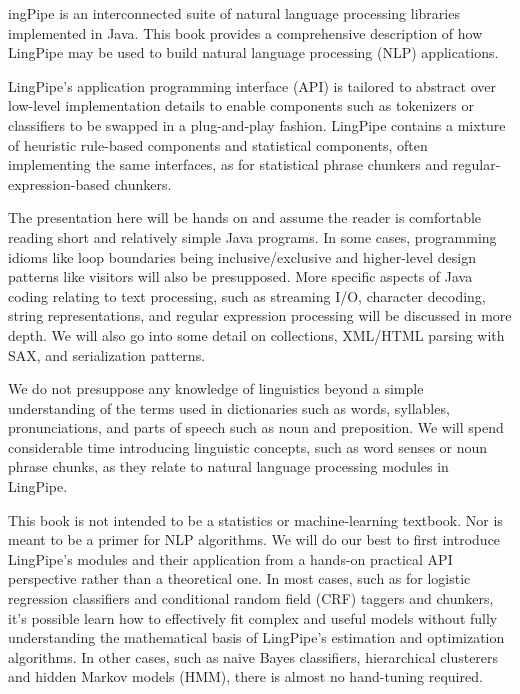 
ingPipe is an interconnected suite of natural language
processing libraries implemented in Java.  This book provides a
comprehensive description of how LingPipe may be used to build natural
language processing (NLP) applications.

LingPipe's application programming interface (API) is tailored to
abstract over low-level implementation details to enable components
such as tokenizers or classifiers to be swapped in a plug-and-play
fashion.  LingPipe contains a mixture of heuristic rule-based components and
statistical components, often implementing the same interfaces, as for
statistical phrase chunkers and regular-expression-based chunkers.

The presentation here will be hands on and assume the reader is
comfortable reading short and relatively simple Java programs.  In
some cases, programming idioms like loop boundaries being
inclusive/exclusive and higher-level design patterns like visitors
will also be presupposed.  More specific aspects of Java coding
relating to text processing, such as streaming I/O, character
decoding, string representations, and regular expression processing
will be discussed in more depth.  We will also go into some detail on
collections, XML/HTML parsing with SAX, and serialization patterns.

We do not presuppose any knowledge of linguistics beyond a simple
understanding of the terms used in dictionaries such as words,
syllables, pronunciations, and parts of speech such as noun and
preposition.  We will spend considerable time introducing linguistic
concepts, such as word senses or noun phrase chunks, as they relate to
natural language processing modules in LingPipe.

This book is not intended to be a statistics or machine-learning
textbook.  Nor is meant to be a primer for NLP algorithms.  We will do
our best to first introduce LingPipe's modules and their application
from a hands-on practical API perspective rather than a theoretical
one.  In most cases, such as for logistic regression classifiers and
conditional random field (CRF) taggers and chunkers, it's possible
learn how to effectively fit complex and useful models without fully
understanding the mathematical basis of LingPipe's estimation and
optimization algorithms.  In other cases, such as naive Bayes
classifiers, hierarchical clusterers and hidden Markov models (HMM),
there is almost no hand-tuning required.

